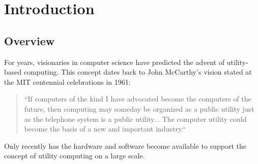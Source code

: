 
\chapter{Introduction}
\label{chap:intro}

\section{Overview}
\label{sec:overview}

\begin{comment}
\TODO{Give quick very high level view. 

Provide insightful quote regarding scientific computation 

Breifly describe current state of Distributed Systems.

Introduce the importance and impact of HPC.

Introduce need/desire for flexible utility computing.
- list major virtualization advantages

Describe major differences between HPC and cloud

Define how a merger between HPC and Cloud computing is desired.

Introduce how Virtual Clusters, can do this.
- what is a virtual cluster? What is it not?
- Missing performance considerations.

}
\end{comment}


For years, visionaries in computer science have predicted the advent of utility-based computing.  This concept dates back to John McCarthy's vision stated at the MIT centennial celebrations in 1961:

\begin{quote}
``If computers of the kind I have advocated become the computers of the future, then computing may someday be organized as a public utility just as the telephone system is a public utility... The computer utility could become  the basis of a new and important industry.``
\end{quote}
 Only recently has the hardware and software become available to support the concept of utility computing on a large scale.

